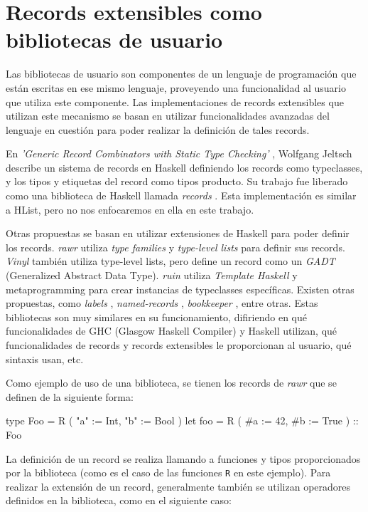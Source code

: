 \section{Records extensibles como bibliotecas de usuario}

Las bibliotecas de usuario son componentes de un lenguaje de programación que están escritas en ese mismo lenguaje, proveyendo una funcionalidad al usuario que utiliza este componente. Las implementaciones de records extensibles que utilizan este mecanismo se basan en utilizar funcionalidades avanzadas del lenguaje en cuestión para poder realizar la definición de tales records.

En \textit{'Generic Record Combinators with Static Type Checking'} \cite{Jeltsch:2010:GRC:1836089.1836108}, Wolfgang Jeltsch describe un sistema de records en Haskell definiendo los records como typeclasses, y los tipos y etiquetas del record como tipos producto. Su trabajo fue liberado como una biblioteca de Haskell llamada \textit{records} \cite{HaskellRecords}. Esta implementación es similar a HList, pero no nos enfocaremos en ella en este trabajo.

Otras propuestas se basan en utilizar extensiones de Haskell para poder definir los records. \textit{rawr} \cite{HaskellRawr} utiliza \textit{type families} y \textit{type-level lists} para definir sus records. \textit{Vinyl} \cite{HaskellVinyl} también utiliza type-level lists, pero define un record como un \textit{GADT} (Generalized Abstract Data Type). \textit{ruin} \cite{HaskellRuin} utiliza \textit{Template Haskell} y metaprogramming para crear instancias de typeclasses específicas. Existen otras propuestas, como \textit{labels} \cite{HaskellLabels}, \textit{named-records} \cite{HaskellNamedRecords}, \textit{bookkeeper} \cite{HaskellBookkeeper}, entre otras. Estas bibliotecas son muy similares en su funcionamiento, difiriendo en qué funcionalidades de GHC (Glasgow Haskell Compiler) y Haskell utilizan, qué funcionalidades de records y records extensibles le proporcionan al usuario, qué sintaxis usan, etc.

Como ejemplo de uso de una biblioteca, se tienen los records de \textit{rawr} que se definen de la siguiente forma:

\begin{code}
type Foo = R ( "a" := Int, "b" := Bool )
let foo = R ( #a := 42, #b := True ) :: Foo
\end{code}

La definición de un record se realiza llamando a funciones y tipos proporcionados por la biblioteca (como es el caso de las funciones \texttt{R} en este ejemplo). Para realizar la extensión de un record, generalmente también se utilizan operadores definidos en la biblioteca, como en el siguiente caso:

